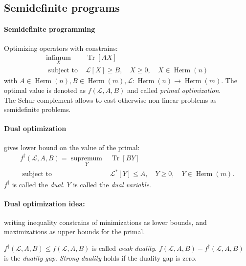 \subsection{Semidefinite programs}
\paragraph{Semidefinite programming} Optimizing operators with constrains:
$$\begin{aligned} \underset{X}{\operatorname{infimum}} & \operatorname{Tr}[A X] \\
\text { subject to } & \mathcal{L}[X] \geq B, \quad X \geq 0, \quad X \in \operatorname{Herm}(n)\end{aligned}$$
with $A \in \operatorname{Herm}(n), B \in \operatorname{Herm}(m), \mathcal{L}: \operatorname{Herm}(n) \rightarrow \operatorname{Herm}(m)$.
The optimal value is denoted as $f(\mathcal{L},A,B)$ and called \emph{primal optimization}.\\
The Schur complement allows to cast otherwise non-linear problems as semidefinite problems.

\paragraph{Dual optimization} gives lower bound on the value of the primal: 
$$\begin{aligned} f^{\dagger}(\mathcal{L}, A, B)=\underset{Y}{\text { supremum }} & \operatorname{Tr}[B Y] \\
\text { subject to } & \mathcal{L}^*[Y] \leq A, \quad Y \geq 0, \quad Y \in \operatorname{Herm}(m) .\end{aligned}$$
$f^\dagger$ is called the \emph{dual}. $Y$ is called the \emph{dual variable}.

\paragraph{Dual optimization idea:} writing inequality constrains of minimizations as lower bounds,
and maximizations as upper bounds for the primal.

\begin{remark}
  $f^{\dagger}(\mathcal{L}, A, B) \leq f(\mathcal{L}, A, B)$ is called \emph{weak duality}. 
  $f(\mathcal{L}, A, B)-f^{\dagger}(\mathcal{L}, A, B)$ is the \emph{duality gap}.
  \emph{Strong duality} holds if the duality gap is zero. 
\end{remark}

